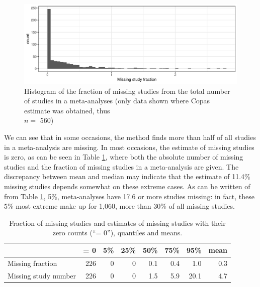 \documentclass[11pt,a4paper,twoside]{book}\usepackage[]{graphicx}\usepackage[]{color}
\newenvironment{knitrout}{}{} %
\begin{document}
\begin{figure}
\begin{knitrout}
\color{fgcolor}

{\centering \includegraphics[width=\textwidth-3cm]{figure/ch03_figunnamed-chunk-26-1} 

}



\end{knitrout}
\caption{Histogram of the fraction of missing studies from the total number of studies in a meta-analyses (only data shown where Copas estimate was obtained, thus \\$n =$ 560)}
\label{fig:copas.missing}
\end{figure}

\vspace{-2mm}
We can see that in some occasions, the method finds more than half of all studies in a meta-analysis are missing. In most occasions, the estimate of missing studies is zero, as can be seen in Table \ref{copas.missing}, where both the absolute number of missing studies and the fraction of missing studies in a meta-analysis are given. The discrepancy between mean and median may indicate that the estimate of 11.4\% missing studies depends somewhat on these extreme cases. As can be written of from Table \ref{copas.missing}, 5\%,  meta-analyses have 17.6 or more studies missing: in fact, these 5\% most extreme make up for 1,060, more than 30\% of all missing studies.

\begin{table}[ht]
\centering
\begingroup\footnotesize
\begin{tabular}{lrrrrrrr}
  \hline
 & = 0 & 5\% & 25\% & 50\% & 75\% & 95\% & mean \\ 
  \hline
Missing fraction & 226 & 0 & 0 & 0.1 & 0.4 & 1.0 & 0.3 \\ 
  Missing study number & 226 & 0 & 0 & 1.5 & 5.9 & 20.1 & 4.7 \\ 
   \hline
\end{tabular}
\endgroup
\caption{Fraction of missing studies and estimates of missing studies with their zero counts (``= 0''), quantiles and means.} 
\label{copas.missing}
\end{table}
\end{document}
